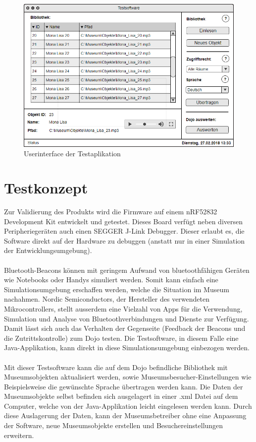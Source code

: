 \documentclass[10pt,a4paper,oneside]{99_fhnwreport}
\begin{document}
\begin{figure}[htb]
\includegraphics[width=\textwidth]{Testsoftware.png}
\caption{Userinterface der Testaplikation} %
\label{fig:testaplikation}
\end{figure}

\section{Testkonzept}\label{sec:testkonzept}
Zur Validierung des Produkts wird die Firmware auf einem nRF52832 Development Kit entwickelt und getestet. Dieses Board verfügt neben diversen Peripheriegeräten auch einen SEGGER J-Link Debugger. Dieser erlaubt es, die Software direkt auf der Hardware zu debuggen (anstatt nur in einer Simulation der Entwicklungsumgebung).\\
\\
Bluetooth-Beacons können mit geringem Aufwand von bluetoothfähigen Geräten wie Notebooks oder Handys simuliert werden. Somit kann einfach eine Simulationsumgebung erschaffen werden, welche die Situation im Museum nachahmen. Nordic Semiconductors, der Hersteller des verwendeten Mikrocontrollers, stellt ausserdem eine Vielzahl von Apps für die Verwendung, Simulation und Analyse von Bluetoothverbindungen und Dienste zur Verfügung. Damit lässt sich auch das Verhalten der Gegenseite (Feedback der Beacons und die Zutrittskontrolle) zum Dojo testen. Die Testsoftware, in diesem Falle eine Java-Applikation, kann direkt in diese Simulationsumgebung einbezogen werden.\\
\\
Mit dieser Testsoftware kann die auf dem Dojo befindliche Bibliothek mit Museumsobjekten aktualisiert werden, sowie Museumsbesucher-Einstellungen wie Beispielsweise die gewünschte Sprache übertragen werden kann. Die Daten der Museumsobjekte selbst befinden sich ausgelagert in einer .xml Datei auf dem Computer, welche von der Java-Applikation leicht eingelesen werden kann. Durch diese Auslagerung der Daten, kann der Museumsbetreiber ohne eine Anpassung der Software, neue Museumsobjekte erstellen und Besuchereinstellungen erweitern.
\end{document}
